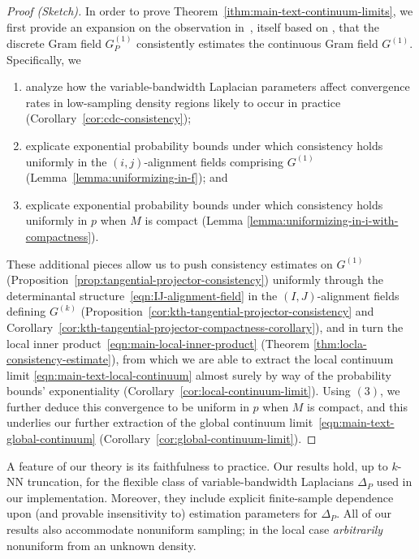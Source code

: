 \documentclass{article}
\newcommand{\kelly}[1]{}
\theoremstyle{remark}
\theoremstyle{plain}
\begin{document}
\begin{proof}[Proof (Sketch)]
    


In order to prove Theorem~\ref{ithm:main-text-continuum-limits}, we first provide an expansion on the observation in~\cite{jones2026manifolddiffusiongeometrycurvature}, itself based on \cite{Berry2016}, that the discrete Gram field $G^{(1)}_{P}$ consistently estimates the continuous Gram field $G^{(1)}$. Specifically, we
\begin{enumerate}
    \item analyze how the variable-bandwidth Laplacian parameters affect convergence rates in low-sampling density regions likely to occur in practice (Corollary~\ref{cor:cdc-consistency});
    \item explicate exponential probability bounds under which consistency holds uniformly in the \( (i,j) \)-alignment fields comprising \( G^{(1)} \)(Lemma~\ref{lemma:uniformizing-in-f}); and
    \item explicate exponential probability bounds under which consistency holds uniformly in $p$ when $M$ is compact (Lemma \ref{lemma:uniformizing-in-i-with-compactness}). 
\end{enumerate}
These additional pieces allow us to push consistency estimates on $G^{(1)}$ (Proposition~\ref{prop:tangential-projector-consistency}) uniformly through the determinantal structure~\eqref{eqn:IJ-alignment-field}  in the \( (I,J) \)-alignment fields defining $G^{(k)}$ (Proposition~\ref{cor:kth-tangential-projector-consistency} and Corollary~\ref{cor:kth-tangential-projector-compactness-corollary}), and in turn the local inner product~\eqref{eqn:main-local-inner-product} (Theorem \ref{thm:locla-consistency-estimate}), from which we are able to extract the local continuum limit \eqref{eqn:main-text-local-continuum} almost surely by way of the probability bounds' exponentiality (Corollary~\ref{cor:local-continuum-limit}). Using $(3)$, we further deduce this convergence to be uniform in $p$ when $M$ is compact, and this underlies our further extraction of the global continuum limit~\eqref{eqn:main-text-global-continuum} (Corollary~\ref{cor:global-continuum-limit}). 
\end{proof}
 A feature of our theory is its faithfulness to practice. Our results hold, up to $k$-NN truncation, for the flexible class of variable-bandwidth Laplacians $\Delta_{P}$ used in our implementation. Moreover, they include explicit finite-sample dependence upon (and provable insensitivity to) estimation parameters for $\Delta_{P}$. All of our results also accommodate nonuniform sampling; in the local case \textit{arbitrarily} nonuniform from an unknown density. %
\end{document}
